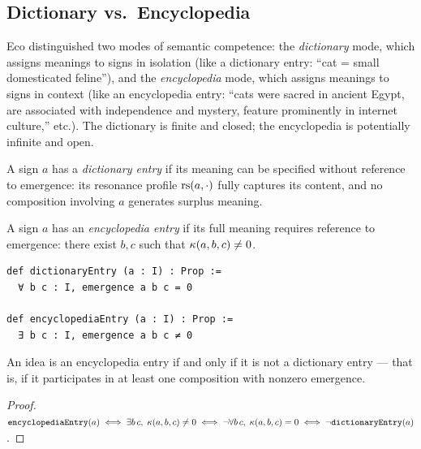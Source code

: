 \subsection{Dictionary vs.\ Encyclopedia}

Eco distinguished two modes of semantic competence: the
\emph{dictionary} mode, which assigns meanings to signs in isolation
(like a dictionary entry: ``cat = small domesticated feline''), and
the \emph{encyclopedia} mode, which assigns meanings to signs in
context (like an encyclopedia entry: ``cats were sacred in ancient
Egypt, are associated with independence and mystery, feature
prominently in internet culture,'' etc.). The dictionary is finite and
closed; the encyclopedia is potentially infinite and open.

\begin{definition}
\label{def:dictionary}
A sign $a$ has a \emph{dictionary entry} if its meaning can be
specified without reference to emergence: its resonance profile
$\mathrm{rs}(a, \cdot)$ fully captures its content, and no composition
involving $a$ generates surplus meaning.
\end{definition}

\begin{definition}
\label{def:encyclopedia}
A sign $a$ has an \emph{encyclopedia entry} if its full meaning
requires reference to emergence: there exist $b, c$ such that
$\kappa(a, b, c) \neq 0$.
\end{definition}

\begin{lstlisting}[caption={Dictionary vs.\ encyclopedia entries}]
def dictionaryEntry (a : I) : Prop :=
  ∀ b c : I, emergence a b c = 0

def encyclopediaEntry (a : I) : Prop :=
  ∃ b c : I, emergence a b c ≠ 0
\end{lstlisting}

\begin{theorem}
\label{thm:encyclopedia-emergence}
An idea is an encyclopedia entry if and only if it is not a dictionary
entry --- that is, if it participates in at least one composition with
nonzero emergence.
\end{theorem}

\begin{proof}
$\texttt{encyclopediaEntry}(a) \iff \exists b\,c,\;
\kappa(a,b,c) \neq 0 \iff \neg\forall b\,c,\;
\kappa(a,b,c) = 0 \iff \neg\texttt{dictionaryEntry}(a)$.
\end{proof}

